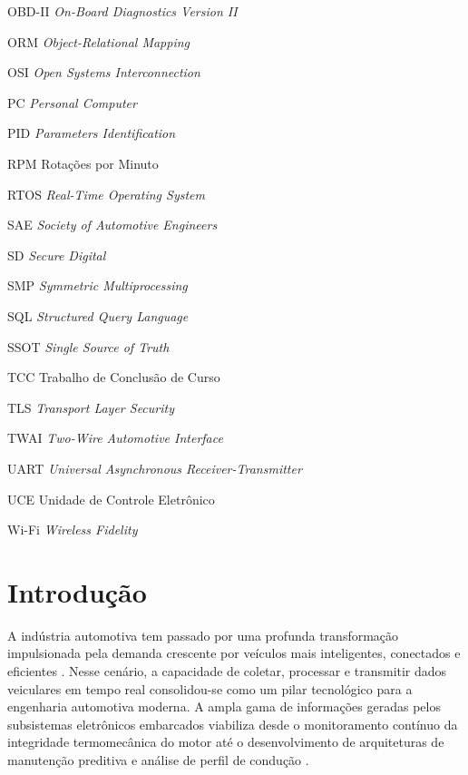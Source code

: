 \documentclass[
	12pt,				%
	openright,			%
	twoside,			%
	a4paper,			%
	english,			%
	brazil				%
	]{abntex2}
\begin{document}
\begin{siglas}
  \item[OBD-II] \textit{On-Board Diagnostics Version II}
  \item[ORM] \textit{Object-Relational Mapping}
  \item[OSI] \textit{Open Systems Interconnection}
  \item[PC] \textit{Personal Computer}
  \item[PID] \textit{Parameters Identification}
  \item[RPM] Rotações por Minuto
  \item[RTOS] \textit{Real-Time Operating System}
  \item[SAE] \textit{Society of Automotive Engineers}
  \item[SD] \textit{Secure Digital}
  \item[SMP] \textit{Symmetric Multiprocessing}
  \item[SQL] \textit{Structured Query Language}
  \item[SSOT] \textit{Single Source of Truth}
  \item[TCC] Trabalho de Conclusão de Curso
  \item[TLS] \textit{Transport Layer Security}
  \item[TWAI] \textit{Two-Wire Automotive Interface}
  \item[UART] \textit{Universal Asynchronous Receiver-Transmitter}
  \item[UCE] Unidade de Controle Eletrônico
  \item[Wi-Fi] \textit{Wireless Fidelity}
\end{siglas}

\tableofcontents*
\cleardoublepage

\textual
\glsresetall

\chapter{Introdução}

A indústria automotiva tem passado por uma profunda transformação impulsionada pela
demanda crescente por veículos mais inteligentes, conectados e eficientes
\cite{llopis2021}. Nesse cenário, a capacidade de coletar, processar e transmitir dados
veiculares em tempo real consolidou-se como um pilar tecnológico para a engenharia
automotiva moderna. A ampla gama de informações geradas pelos subsistemas eletrônicos
embarcados viabiliza desde o monitoramento contínuo da integridade termomecânica do
motor até o desenvolvimento de arquiteturas de manutenção preditiva e análise de perfil
de condução \cite{andria2016}.
\end{document}
